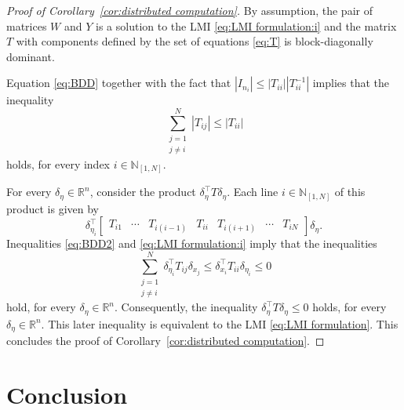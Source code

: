 \documentclass[10pt,twocolumn,twoside]{IEEEtran}
\theoremstyle{plain}
\theoremstyle{definition}
\theoremstyle{remark}
\begin{document}
\begin{proof}[Proof of Corollary~\ref{cor:distributed computation}]
	By assumption, the pair of matrices $W$ and $Y$ is a solution to the LMI \eqref{eq:LMI formulation:i} and the matrix $T$ with components defined by the set of equations \eqref{eq:T} is block-diagonally dominant.
	
	Equation \eqref{eq:BDD} together with the fact that $|I_{n_i}|\leq |T_{ii}||T_{ii}^{-1}|$ implies that the inequality
	\begin{equation}\label{eq:BDD2} 
		\sum_{\substack{j=1\\ j\neq i}}^N|T_{ij}|\leq |T_{ii}|
	\end{equation}
	holds, for every index $i\in\mathbb{N}_{[1,N]}$.
	
	For every $\delta_\eta\in\mathbb{R}^n$, consider the product $\delta_\eta^\top T\delta_\eta$. Each line $i\in\mathbb{N}_{[1,N]}$ of this product is given by
	\begin{equation*}
		\delta_{\eta_i}^\top\begin{bmatrix}
			T_{i1}&\cdots&T_{i(i-1)}&T_{ii}&T_{i(i+1)}&\cdots&T_{iN}
		\end{bmatrix}\delta_\eta.
	\end{equation*}
	Inequalities \eqref{eq:BDD2} and \eqref{eq:LMI formulation:i} imply that the inequalities
	\begin{equation*}
		\sum_{\substack{j=1\\ j\neq i}}^N\delta_{\eta_i}^\top T_{ij}\delta_{x_j}\leq \delta_{x_i}^\top T_{ii}\delta_{\eta_i}\leq 0
	\end{equation*}
	hold, for every $\delta_\eta\in\mathbb{R}^n$. Consequently, the inequality $\delta_\eta^\top T\delta_\eta\leq 0$ holds, for every $\delta_\eta\in\mathbb{R}^n$. This later inequality is equivalent to the LMI \eqref{eq:LMI formulation}. This concludes the proof of Corollary~\ref{cor:distributed computation}.
\end{proof}


\section{Conclusion}\label{sec:Conclusion}

\appendices


\ifCLASSOPTIONcaptionsoff
  \newpage
\fi
\end{document}
